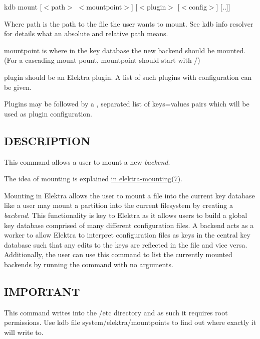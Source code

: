 {\ttfamily kdb mount \mbox{[}$<$path$>$ $<$mountpoint$>$\mbox{]} \mbox{[}$<$plugin$>$ \mbox{[}$<$config$>$\mbox{]} \mbox{[}..\mbox{]}\mbox{]}}


\begin{DoxyItemize}
\item Where {\ttfamily path} is the path to the file the user wants to mount. See {\ttfamily kdb info resolver} for details what an absolute and relative path means.
\item {\ttfamily mountpoint} is where in the key database the new backend should be mounted. (For a cascading mount pount, {\ttfamily mountpoint} should start with {\ttfamily /})
\item {\ttfamily plugin} should be an Elektra plugin. A list of such plugins with configuration can be given.
\item Plugins may be followed by a {\ttfamily ,} separated list of {\ttfamily keys=values} pairs which will be used as plugin configuration.
\end{DoxyItemize}

\subsection*{D\+E\+S\+C\+R\+I\+P\+T\+I\+O\+N}

This command allows a user to mount a new {\itshape backend}.

The idea of mounting is explained \hyperlink{md_doc_help_elektra-mounting_doc_help_elektra-mounting_md}{in elektra-\/mounting(7)}.

Mounting in Elektra allows the user to mount a file into the current key database like a user may mount a partition into the current filesystem by creating a {\itshape backend}. This functionality is key to Elektra as it allows users to build a global key database comprised of many different configuration files. A backend acts as a worker to allow Elektra to interpret configuration files as keys in the central key database such that any edits to the keys are reflected in the file and vice versa. Additionally, the user can use this command to list the currently mounted backends by running the command with no arguments.

\subsection*{I\+M\+P\+O\+R\+T\+A\+N\+T}

This command writes into the {\ttfamily /etc} directory and as such it requires root permissions. Use {\ttfamily kdb file system/elektra/mountpoints} to find out where exactly it will write to.

